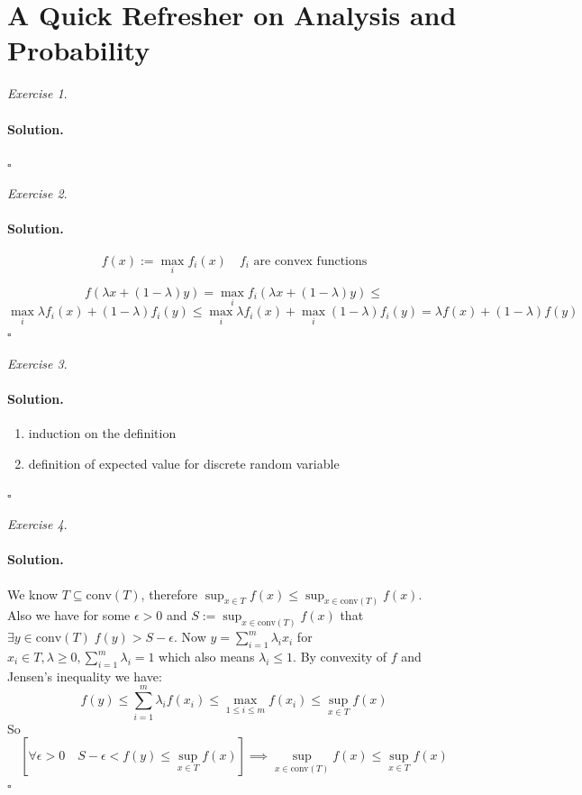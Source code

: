 \documentclass[11pt]{article}
\theoremstyle{definition}
\theoremstyle{remark}
\newtheorem{exercise}{Exercise}[section]
\newenvironment{solution}{\paragraph{Solution.}}{\hfill$\square$\medskip}
\newcommand{\1}{\mathbf{1}}
\newcommand{\conv}{\text{conv}}
\begin{document}
\section{A Quick Refresher on Analysis and Probability}

\begin{exercise}
	
\end{exercise}

\begin{solution}

\end{solution}

\bigskip

\begin{exercise}
	
\end{exercise}

\begin{solution}
\[
f(x) := \max_{i} f_i(x)\quad f_i \text{ are convex functions}
\]

\[
f(\lambda x + (1-\lambda) y ) = \max_{i} f_i( \lambda x + (1-\lambda) y ) \leq 
\]
\[
\max_{i} \lambda f_i(x) + (1-\lambda) f_i(y) \leq \max_{i} \lambda f_i(x) + \max_{i} (1-\lambda) f_i(y) =  \lambda  f(x) + (1- \lambda ) f(y)
\]
\end{solution}

\bigskip

\begin{exercise}

\end{exercise}

\begin{solution}
	\begin{enumerate}
		\item induction on the definition
		\item  definition of expected value for discrete random variable
	\end{enumerate}
\end{solution}


\begin{exercise}

\end{exercise}
\begin{solution}
	
We know \(T \subseteq \conv(T) \), therefore \(\sup_{x\in T} f(x) \leq \sup_{ x\in\conv(T) } f(x)\).\\
Also we have for some \(\epsilon>0\) and \(S:= \sup_{ x\in\conv(T) } f(x)\) that \(\exists y \in \conv(T)\; f(y) > S - \epsilon \). Now \(y = \sum_{i=1}^{m} \lambda_i x_i\) for \(x_i \in T, \lambda \geq 0, \sum_{i=1}^{m}\lambda_i = 1\) which also means \(\lambda_i \leq 1\). By convexity of \(f\) and Jensen's inequality we have:
\[
f(y) \leq \sum_{i=1}^{m} \lambda_i f(x_i) \leq \max_{1\leq i\leq m} f(x_i) \leq \sup_{x\in T} f(x)
\]
So
\[
[\forall \epsilon>0 \quad S - \epsilon < f(y) \leq \sup_{x\in T} f(x) ]\implies \sup_{ x\in\conv(T) } f(x) \leq \sup_{x\in T} f(x)
\]
\end{solution}
\end{document}
